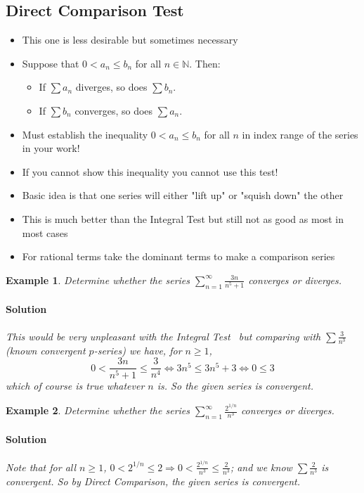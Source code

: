 \documentclass[letterpaper, 11pt, openany]{book}
\theoremstyle{mytheoremstyle}
\theoremstyle{myexamplestyle}
\newtheorem{example}{Example}[section]
\newenvironment{solution}{\paragraph{\sffamily \smaller \fontseries{b}\selectfont Solution}}{\hfill\faSquare}
\begin{document}
\subsection{Direct Comparison Test}
\begin{itemize}
    \item This one is less desirable but sometimes necessary \faMeh
    \item Suppose that $0 < a_{n} \leq b_{n}$ for all $n \in \mathbb{N}$. Then:
    \begin{itemize}
        \item If $\sum a_{n}$ diverges, so does $\sum b_{n}$.
        \item If $\sum b_{n}$ converges, so does $\sum a_{n}$.
    \end{itemize}
    \item[{\faExclamationTriangle[solid]}] Must establish the inequality $0 < a_{n} \leq b_{n}$ for all $n$ in index range of the series in your work!
    \item[{\faExclamationTriangle[solid]}] If you cannot show this inequality you cannot use this test! 
    \item Basic idea is that one series will either "lift up" or "squish down" the other
    \item This is much better than the Integral Test but still not as good as most in most cases
    \item For rational terms take the dominant terms to make a comparison series
\end{itemize}

\begin{example}\label{e:seriescomptestpseries}
    Determine whether the series $\displaystyle \sum_{n=1}^{\infty} \frac{3n}{n^{5} +  1}$ converges or diverges.
    
    \begin{solution}
        This would be very unpleasant with the Integral Test \faFrown \ but comparing with $\sum \frac{3}{n^{3}}$ (known convergent $p$-series) we have, for $n \geq 1$,
        \[0 < \frac{3n}{n^{5} + 1} \leq \frac{3}{n^{4}} \Leftrightarrow 3n^{5}  \leq 3n^{5} + 3 \Leftrightarrow 0 \leq 3\]
        which of course is true whatever $n$ is. So the given series is convergent.
    \end{solution}
\end{example}

\begin{example}\label{e:seriescomptestexp}
    Determine whether the series $\displaystyle \sum_{n=1}^{\infty} \frac{2^{1/n}}{n^{3}}$ converges or diverges.
    
    \begin{solution}
        Note that for all $n \geq 1$, $0< 2^{1/n} \leq 2 \Rightarrow 0 < \frac{2^{1/n}}{n^{3}} \leq \frac{2}{n^{3}}$; and we know $\sum \frac{2}{n^{3}}$ is convergent. So by Direct Comparison, the given series is convergent.
    \end{solution}
\end{example}
\end{document}
